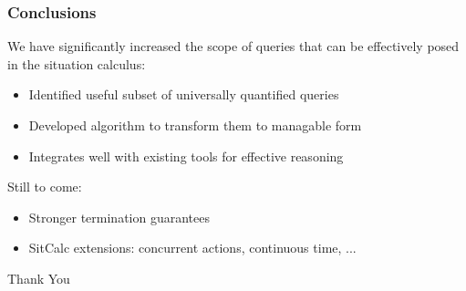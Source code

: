 \documentclass[compress]{beamer}
\begin{document}
\begin{frame}
\frametitle{Conclusions}
We have significantly increased the scope of queries that can be effectively
posed in the situation calculus:
\begin{itemize}
 \item Identified useful subset of universally quantified queries
 \item Developed algorithm to transform them to managable form
 \item Integrates well with existing tools for effective reasoning
\end{itemize}
Still to come:
\begin{itemize}
 \item Stronger termination guarantees
 \item SitCalc extensions: concurrent actions, continuous time, ...
\end{itemize}
\end{frame}

\begin{frame}
\centering \large Thank You\\
\end{frame}
\end{document}
